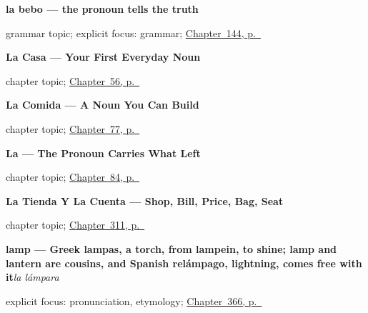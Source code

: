 \noindent\begin{minipage}[t]{\linewidth}
\raggedright
\textbf{la bebo — the pronoun tells the truth}\par
\footnotesize grammar topic; explicit focus: grammar; \hyperref[ch:pronoun-evidence]{Chapter~144, p.~\pageref*{ch:pronoun-evidence}}
\end{minipage}\par\smallskip

\noindent\begin{minipage}[t]{\linewidth}
\raggedright
\textbf{La Casa --- Your First Everyday Noun}\par
\footnotesize chapter topic; \hyperref[ch:noun-casa]{Chapter~56, p.~\pageref*{ch:noun-casa}}
\end{minipage}\par\smallskip

\noindent\begin{minipage}[t]{\linewidth}
\raggedright
\textbf{La Comida --- A Noun You Can Build}\par
\footnotesize chapter topic; \hyperref[ch:noun-comida]{Chapter~77, p.~\pageref*{ch:noun-comida}}
\end{minipage}\par\smallskip

\noindent\begin{minipage}[t]{\linewidth}
\raggedright
\textbf{La --- The Pronoun Carries What Left}\par
\footnotesize chapter topic; \hyperref[ch:pronoun-la]{Chapter~84, p.~\pageref*{ch:pronoun-la}}
\end{minipage}\par\smallskip

\noindent\begin{minipage}[t]{\linewidth}
\raggedright
\textbf{La Tienda Y La Cuenta --- Shop, Bill, Price, Bag, Seat}\par
\footnotesize chapter topic; \hyperref[ch:la-tienda-y-la-cuenta]{Chapter~311, p.~\pageref*{ch:la-tienda-y-la-cuenta}}
\end{minipage}\par\smallskip

\noindent\begin{minipage}[t]{\linewidth}
\raggedright
\textbf{lamp — Greek lampas, a torch, from lampein, to shine; lamp and lantern are cousins, and Spanish relámpago, lightning, comes free with it}\enspace\emph{la lámpara}\par
\footnotesize explicit focus: pronunciation, etymology; \hyperref[ch:la-caja-y-la-lampara]{Chapter~366, p.~\pageref*{ch:la-caja-y-la-lampara}}
\end{minipage}\par\smallskip

